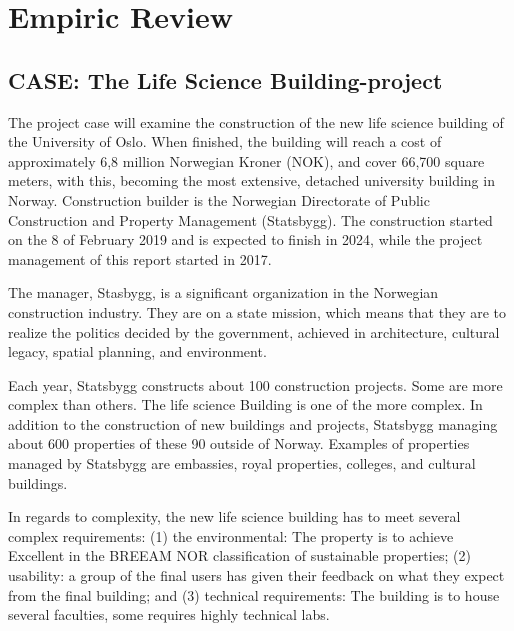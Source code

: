
\chapter{Empiric Review}
\section{CASE: The Life Science Building-project}
The project case will examine the construction of the new life science building of the University of Oslo. When finished, the building will reach a cost of approximately 6,8 million Norwegian Kroner (NOK), and cover 66,700 square meters, with this, becoming the most extensive, detached university building in Norway. Construction builder is the Norwegian Directorate of Public Construction and Property Management (Statsbygg). The construction started on the 8 of February 2019 and is expected to finish in 2024, while the project management of this report started in 2017.

The manager, Stasbygg, is a significant organization in the Norwegian construction industry. They are on a state mission, which means that they are to realize the politics decided by the government, achieved in architecture, cultural legacy, spatial planning, and environment. 

Each year, Statsbygg constructs about 100 construction projects. Some are more complex than others. The life science Building is one of the more complex. In addition to the construction of new buildings and projects, Statsbygg managing about 600 properties of these 90 outside of Norway. Examples of properties managed by Statsbygg are embassies, royal properties, colleges, and cultural buildings. 

In regards to complexity, the new life science building has to meet several complex requirements: (1) the environmental: The property is to achieve Excellent in the BREEAM NOR classification of sustainable properties; (2) usability: a group of the final users has given their feedback on what they expect from the final building; and (3) technical requirements: The building is to house several faculties, some requires highly technical labs.

